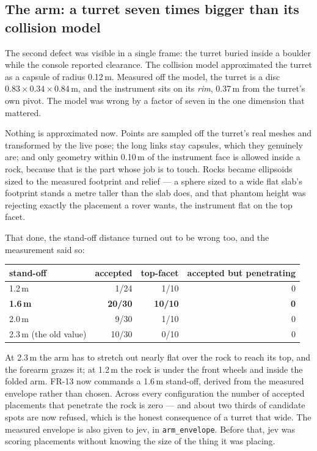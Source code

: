 \documentclass[11pt]{article}
\begin{document}
\subsection{The arm: a turret seven times bigger than its collision model}
The second defect was visible in a single frame: the turret buried inside a boulder while the console reported clearance. The collision model approximated the turret as a capsule of radius 0.12\,m. Measured off the model, the turret is a disc $0.83\times0.34\times0.84$\,m, and the instrument sits on its \emph{rim}, 0.37\,m from the turret's own pivot. The model was wrong by a factor of seven in the one dimension that mattered.

Nothing is approximated now. Points are sampled off the turret's real meshes and transformed by the live pose; the long links stay capsules, which they genuinely are; and only geometry within 0.10\,m of the instrument face is allowed inside a rock, because that is the part whose job is to touch. Rocks became ellipsoids sized to the measured footprint and relief --- a sphere sized to a wide flat slab's footprint stands a metre taller than the slab does, and that phantom height was rejecting exactly the placement a rover wants, the instrument flat on the top facet.

That done, the stand-off distance turned out to be wrong too, and the measurement said so:

\begin{center}
\begin{tabular}{@{}lrrr@{}}
\toprule
stand-off & accepted & top-facet & accepted but penetrating \\
\midrule
1.2\,m & 1/24 & 1/10 & 0 \\
\textbf{1.6\,m} & \textbf{20/30} & \textbf{10/10} & \textbf{0} \\
2.0\,m & 9/30 & 1/10 & 0 \\
2.3\,m (the old value) & 10/30 & 0/10 & 0 \\
\bottomrule
\end{tabular}
\end{center}

At 2.3\,m the arm has to stretch out nearly flat over the rock to reach its top, and the forearm grazes it; at 1.2\,m the rock is under the front wheels and inside the folded arm. FR-13 now commands a 1.6\,m stand-off, derived from the measured envelope rather than chosen. Across every configuration the number of accepted placements that penetrate the rock is zero --- and about two thirds of candidate spots are now refused, which is the honest consequence of a turret that wide. The measured envelope is also given to jev, in \texttt{arm\_envelope}. Before that, jev was scoring placements without knowing the size of the thing it was placing.
\end{document}
